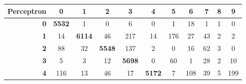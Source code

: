 \documentclass[
	12pt,				%
	openright,			%
	twoside,			%
	a4paper,			%
	english,			%
	brazil,				%
	svgnames
	]{abntex2}\usepackage[]{graphicx}\usepackage[]{color}
\begin{document}
\begin{table}[h]
\begin{tabular}{rcccccccccc}
\multicolumn{1}{r|}{\textbf{Perceptron}} & \textbf{0}                         & \textbf{1}                         & \textbf{2}                         & \textbf{3}                         & \textbf{4}                         & \textbf{5}                         & \textbf{6}                         & \textbf{7}                         & \textbf{8}                         & \textbf{9}                         \\ \hline
\multicolumn{1}{r|}{\textbf{0}}          & \multicolumn{1}{c|}{\textbf{5532}} & 1                                  & 0                                  & 6                                  & 0                                  & 1                                  & 18                                 & 1                                  & 1                                  & 0                                  \\ \cline{2-3}
\multicolumn{1}{r|}{\textbf{1}}          & \multicolumn{1}{c|}{14}            & \multicolumn{1}{c|}{\textbf{6114}} & 46                                 & 217                                & 14                                 & 176                                & 27                                 & 43                                 & 2                                  & 2                                  \\ \cline{3-4}
\multicolumn{1}{r|}{\textbf{2}}          & 88                                 & \multicolumn{1}{c|}{32}            & \multicolumn{1}{c|}{\textbf{5548}} & 137                                & 2                                  & 0                                  & 16                                 & 62                                 & 3                                  & 0                                  \\ \cline{4-5}
\multicolumn{1}{r|}{\textbf{3}}          & 5                                  & 3                                  & \multicolumn{1}{c|}{12}            & \multicolumn{1}{c|}{\textbf{5698}} & 0                                  & 60                                 & 1                                  & 28                                 & 2                                  & 10                                 \\ \cline{5-6}
\multicolumn{1}{r|}{\textbf{4}}          & 116                                & 13                                 & 46                                 & \multicolumn{1}{c|}{17}            & \multicolumn{1}{c|}{\textbf{5172}} & 7                                  & 108                                & 39                                 & 5                                  & 199                                \\ \cline{6-7}

\end{tabular}
\end{table}
\end{document}

